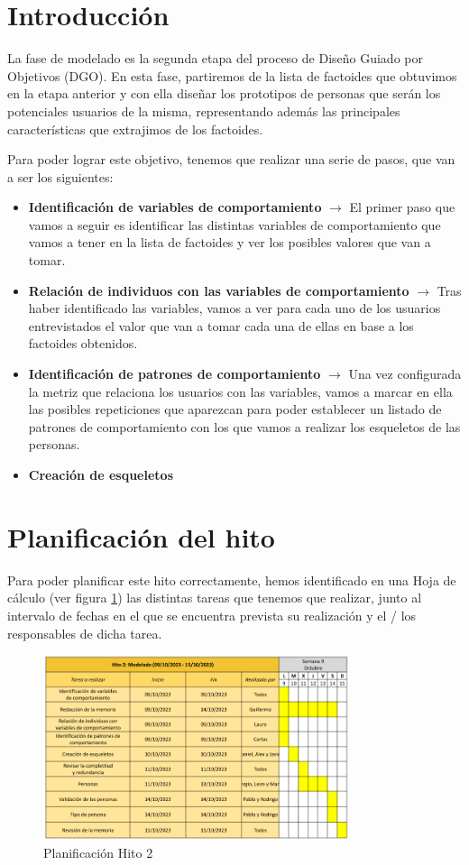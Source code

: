 \section{Introducción}
La fase de modelado es la segunda etapa del proceso de Diseño Guiado por Objetivos (DGO). En esta fase, partiremos de la lista de factoides que
obtuvimos en la etapa anterior y con ella diseñar los prototipos de personas que serán los potenciales usuarios de la misma, representando además
las principales características que extrajimos de los factoides.

Para poder lograr este objetivo, tenemos que realizar una serie de pasos, que van a ser los siguientes:
\begin{itemize}
    \item \textbf{Identificación de variables de comportamiento} $\rightarrow$ El primer paso que vamos a seguir es identificar las distintas variables de comportamiento que vamos a tener en la lista de factoides y ver los posibles valores que van a tomar.
    \item \textbf{Relación de individuos con las variables de comportamiento} $\rightarrow$ Tras haber identificado las variables, vamos a ver para cada uno de los usuarios entrevistados el valor que van a tomar cada una de ellas en base a los factoides obtenidos.
    \item \textbf{Identificación de patrones de comportamiento} $\rightarrow$ Una vez configurada la metriz que relaciona los usuarios con las variables, vamos a marcar en ella las posibles repeticiones que aparezcan para poder establecer un listado de patrones de comportamiento con los que vamos a realizar los esqueletos de las personas.
    \item \textbf{Creación de esqueletos}
\end{itemize}

\section{Planificación del hito}
Para poder planificar este hito correctamente, hemos identificado en una Hoja de cálculo (ver figura \ref{fig:planif-hito2}) las distintas tareas que tenemos que 
realizar, junto al intervalo de fechas en el que se encuentra prevista su realización y el / los responsables de dicha tarea.
\begin{figure}[H]
    \centering 
    \includegraphics[width=0.8\textwidth]{./Imagenes/Planificaciones/Planif-hito2.png}
    \caption{Planificación Hito 2}
    \label{fig:planif-hito2}
\end{figure}


